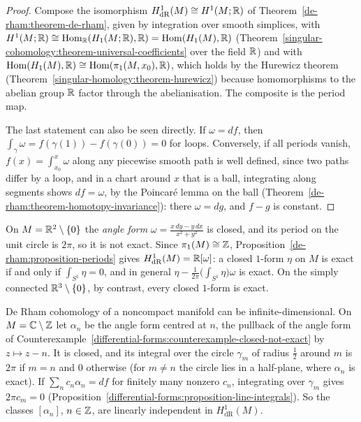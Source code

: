 \begin{proof}
Compose the isomorphism $H^1_{\mathrm{dR}}(M) \cong H^1(M; \mathbb{R})$ of Theorem~\ref{de-rham:theorem-de-rham}, given by integration over smooth simplices, with $H^1(M; \mathbb{R}) \cong \operatorname{Hom}_{\mathbb{R}}(H_1(M; \mathbb{R}), \mathbb{R}) = \operatorname{Hom}(H_1(M), \mathbb{R})$
(Theorem~\ref{singular-cohomology:theorem-universal-coefficients} over the field $\mathbb{R}$) and with $\operatorname{Hom}(H_1(M), \mathbb{R}) \cong \operatorname{Hom}(\pi_1(M, x_0), \mathbb{R})$, which holds by the Hurewicz theorem
(Theorem~\ref{singular-homology:theorem-hurewicz}) because homomorphisms to the abelian group $\mathbb{R}$ factor through the abelianisation. The composite is the period map.

The last statement can also be seen directly. If $\omega = df$, then $\int_\gamma\omega = f(\gamma(1)) - f(\gamma(0)) = 0$ for loops. Conversely, if all periods vanish, $f(x) = \int_{x_0}^x\omega$ along any piecewise smooth path is
well defined, since two paths differ by a loop, and in a chart around $x$ that is a ball, integrating along segments shows $df = \omega$, by the Poincar\'e lemma on the ball
(Theorem~\ref{de-rham:theorem-homotopy-invariance}): there $\omega = dg$, and $f - g$ is constant.
\end{proof}

\begin{example}\label{de-rham:example-angle-form}
On $M = \mathbb{R}^2 \setminus \{0\}$ the \emph{angle form} $\omega = \frac{x\,dy - y\,dx}{x^2 + y^2}$ is closed, and its period on the unit circle is $2\pi$, so it is not exact. Since $\pi_1(M) \cong \mathbb{Z}$, Proposition~\ref{de-rham:proposition-periods}
gives $H^1_{\mathrm{dR}}(M) = \mathbb{R}[\omega]$: a closed $1$-form $\eta$ on $M$ is exact if and only if $\int_{S^1}\eta = 0$, and in general $\eta - \frac{1}{2\pi}\big(\int_{S^1}\eta\big)\omega$ is exact. On the simply connected
$\mathbb{R}^3 \setminus \{0\}$, by contrast, every closed $1$-form is exact.
\end{example}

\begin{counterexample}\label{de-rham:counterexample-infinite-dimensional}
De Rham cohomology of a noncompact manifold can be infinite-dimensional. On $M = \mathbb{C} \setminus \mathbb{Z}$ let $\alpha_n$ be the angle form centred at $n$, the pullback of the angle form of
Counterexample~\ref{differential-forms:counterexample-closed-not-exact} by $z \mapsto z - n$. It is closed, and its integral over the circle $\gamma_m$ of radius $\frac12$ around $m$ is $2\pi$ if $m = n$ and $0$ otherwise (for $m \neq n$ the circle lies in
a half-plane, where $\alpha_n$ is exact). If $\sum_nc_n\alpha_n = d f$ for finitely many nonzero $c_n$, integrating over $\gamma_m$ gives $2\pi c_m = 0$ (Proposition~\ref{differential-forms:proposition-line-integrals}). So the classes
$[\alpha_n]$, $n \in \mathbb{Z}$, are linearly independent in $H^1_{\mathrm{dR}}(M)$.
\end{counterexample}

